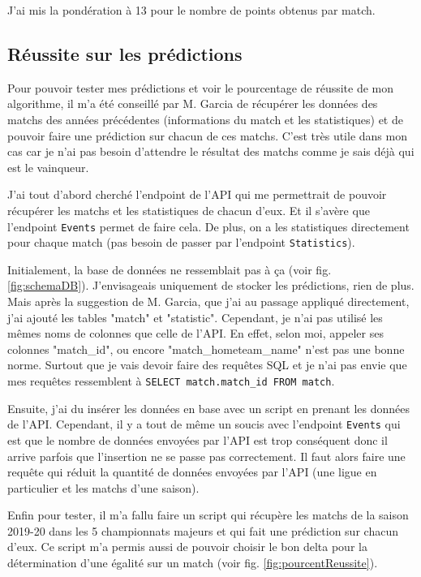 \documentclass[a4paper,14pt]{extarticle}
\begin{document}
{J'ai mis la pondération à 13 pour le nombre de points obtenus par match.

\subsection{Réussite sur les prédictions}
\label{test_pourcent_reussite}

Pour pouvoir tester mes prédictions et voir le pourcentage de réussite de mon algorithme, il m'a été conseillé par M. Garcia de récupérer les données des matchs des années précédentes (informations du match et les statistiques) et de pouvoir faire une prédiction sur chacun de ces matchs. C'est très utile dans mon cas car je n'ai pas besoin d'attendre le résultat des matchs comme je sais déjà qui est le vainqueur.

J'ai tout d'abord cherché l'endpoint de l'API qui me permettrait de pouvoir récupérer les matchs et les statistiques de chacun d'eux. Et il s'avère que l'endpoint \texttt{Events} permet de faire cela. De plus, on a les statistiques directement pour chaque match (pas besoin de passer par l'endpoint \texttt{Statistics}). 

Initialement, la base de données ne ressemblait pas à ça (voir fig. \ref{fig:schemaDB}). J'envisageais uniquement de stocker les prédictions, rien de plus. Mais après la suggestion de M. Garcia, que j'ai au passage appliqué directement, j'ai ajouté les tables "match" et "statistic". Cependant, je n'ai pas utilisé les mêmes noms de colonnes que celle de l'API. En effet, selon moi, appeler ses colonnes "match\_id", ou encore "match\_hometeam\_name" n'est pas une bonne norme. Surtout que je vais devoir faire des requêtes SQL et je n'ai pas envie que mes requêtes ressemblent à \texttt{SELECT match.match\_id FROM match}.

Ensuite, j'ai du insérer les données en base avec un script en prenant les données de l'API. Cependant, il y a tout de même un soucis avec l'endpoint \texttt{Events} qui est que le nombre de données envoyées par l'API est trop conséquent donc il arrive parfois que l'insertion ne se passe pas correctement. Il faut alors faire une requête qui réduit la quantité de données envoyées par l'API (une ligue en particulier et les matchs d'une saison). 

Enfin pour tester, il m'a fallu faire un script qui récupère les matchs de la saison 2019-20 dans les 5 championnats majeurs et qui fait une prédiction sur chacun d'eux. Ce script m'a permis aussi de pouvoir choisir le bon delta pour la détermination d'une égalité sur un match (voir fig. \ref{fig:pourcentReussite}). 



}
\end{document}
